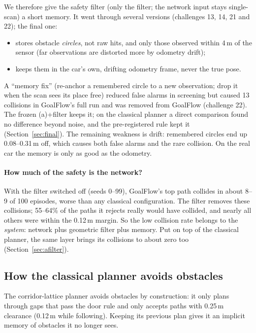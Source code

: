 \documentclass[11pt,a4paper]{article}
\begin{document}
We therefore give the safety filter (only the filter; the network input stays single-scan) a short memory.
It went through several versions (challenges 13, 14, 21 and 22); the final one:
\begin{itemize}[nosep]
  \item stores obstacle \emph{circles}, not raw hits, and only those observed within 4\,m of the sensor
        (far observations are distorted more by odometry drift);
  \item keeps them in the car's own, drifting odometry frame, never the true pose.
\end{itemize}
A ``memory fix'' (re-anchor a remembered circle to a new observation; drop it when the scan sees its place free)
reduced false alarms in screening but caused 13 collisions in GoalFlow's full run and was removed from GoalFlow
(challenge 22). The frozen (a)+filter keeps it; on the classical planner a direct comparison found no difference
beyond noise, and the pre-registered rule kept it (Section~\ref{sec:final}). The
remaining weakness is drift: remembered circles end up 0.08--0.31\,m off, which causes both false alarms and the
rare collision. On the real car the memory is only as good as the odometry.

\paragraph{How much of the safety is the network?} With the filter switched off (seeds 0--99), GoalFlow's top path
collides in about 8--9 of 100 episodes, worse than any classical configuration. The filter removes these
collisions; 55--64\% of the paths it rejects really would have collided, and nearly all others were within the
0.12\,m margin. So the low collision rate belongs to the \emph{system}: network plus geometric filter plus memory.
Put on top of the classical planner, the same layer brings its collisions to about zero too
(Section~\ref{sec:afilter}).

\subsection{How the classical planner avoids obstacles}
The corridor-lattice planner avoids obstacles by construction: it only plans through gaps that pass the
door rule and only accepts paths with 0.25\,m clearance (0.12\,m while following). Keeping its previous
plan gives it an implicit memory of obstacles it no longer sees.

\end{document}
